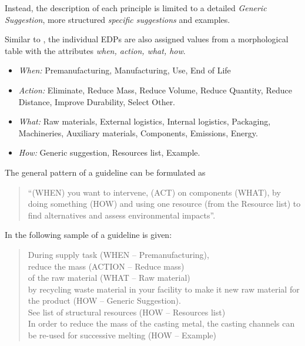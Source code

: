 \documentclass[11pt,a4paper]{article}
\begin{document}
Instead, the description of each principle is limited to a detailed
\emph{Generic Suggestion}, more structured \emph{specific suggestions} and
examples.

Similar to \cite{Gassmann2014}, the individual EDPs are also assigned values
from a morphological table with the attributes \emph{when, action, what,
  how}.
\begin{itemize}
\item \emph{When:} Premanufacturing, Manufacturing, Use, End of Life
\item \emph{Action:} Eliminate, Reduce Mass, Reduce Volume, Reduce Quantity,
  Reduce Distance, Improve Durability, Select Other.
\item \emph{What:} Raw materials, External logistics, Internal logistics,
  Packaging, Machineries, Auxiliary materials, Components, Emissions, Energy.
\item \emph{How:} Generic suggestion, Resources list, Example.
\end{itemize}
The general pattern of a guideline can be formulated as 
\begin{quote}
  “(WHEN) you want to intervene, (ACT) on components (WHAT), by doing
  something (HOW) and using one resource (from the Resource list) to find
  alternatives and assess environmental impacts”.  
\end{quote}
In \cite[Fig. 2]{Russo2020} the following sample of a guideline is given: 
\begin{quote}
  During supply task (WHEN -- Premanufacturing),\\ reduce the mass (ACTION --
  Reduce mass)\\ of the raw material (WHAT -- Raw material)\\ by recycling
  waste material in your facility to make it new raw material for the product
  (HOW -- Generic Suggestion). \\
  See list of structural resources (HOW -- Resources list)\\
  In order to reduce the mass of the casting metal, the casting channels can
  be re-used for successive melting (HOW -- Example) 
\end{quote}
\end{document}
